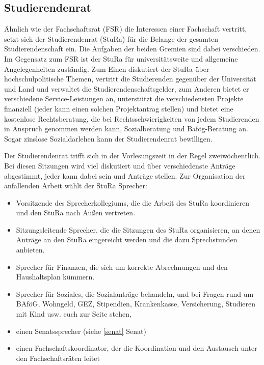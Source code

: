 \subsection{Studierendenrat}

Ähnlich wie der Fachschaftsrat (FSR) die Interessen einer Fachschaft vertritt, setzt sich der Studierendenrat (StuRa) für die Belange der gesamten Studierendenschaft ein.
Die Aufgaben der beiden Gremien sind dabei verschieden.
Im Gegensatz zum FSR ist der StuRa für universitätsweite und allgemeine Angelegenheiten zuständig.
Zum Einen diskutiert der StuRa über hochschulpolitische Themen,  vertritt die Studierenden gegenüber der Universität und Land und verwaltet die Studierendenschaftsgelder, zum Anderen bietet er verschiedene Service-Leistungen an, unterstützt die verschiedensten Projekte finanziell (jeder kann einen solchen Projektantrag stellen) und bietet eine kostenlose Rechtsberatung, die bei Rechtsschwierigkeiten von jedem Studierenden in Anspruch genommen werden kann, Sozialberatung und Bafög-Beratung an.
Sogar zinslose Sozialdarlehen kann der Studierendenrat bewilligen.

Der Studierendenrat trifft sich in der Vorlesungszeit in der Regel zweiwöchentlich.
Bei diesen Sitzungen wird viel diskutiert und über verschiedenste Anträge abgestimmt, jeder kann dabei sein und Anträge stellen.
Zur Organisation der anfallenden Arbeit wählt der StuRa Sprecher:

\begin{itemize}
    \item Vorsitzende des Sprecherkollegiums, die die Arbeit des StuRa koordinieren und den StuRa nach Außen vertreten.
    \item Sitzungsleitende Sprecher, die die Sitzungen des StuRa organisieren, an denen Anträge an den StuRa eingereicht werden und die dazu Sprechstunden anbieten.
    \item Sprecher für Finanzen, die sich um korrekte Abrechnungen und den Haushaltsplan kümmern.
    \item Sprecher für Soziales, die Sozialanträge behandeln, und bei Fragen rund um BAföG, Wohngeld, GEZ, Stipendien, Krankenkasse, Versicherung, Studieren mit Kind usw. euch zur Seite stehen,
    \item einen Senatssprecher (siehe \ref{senat} Senat)
    \item einen Fachschaftskoordinator, der die Koordination und den Austausch unter den Fachschaftsräten leitet
\end{itemize}


